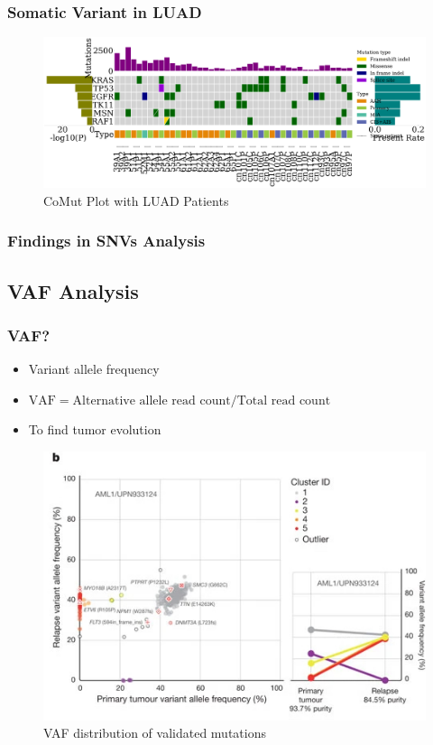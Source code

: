 \documentclass{beamer}
\begin{document}
    \begin{frame}
        \frametitle{Somatic Variant in LUAD}

        \begin{figure}
            \includegraphics[width=\linewidth]{figures/Mutect2/BWA-ADC.pdf}
            \caption{CoMut Plot with LUAD Patients}
        \end{figure}
    \end{frame}

    \begin{frame}
        \frametitle{Findings in SNVs Analysis}
    \end{frame}

    \subsection{VAF Analysis}
    \begin{frame}
        \frametitle{VAF?}

        \begin{itemize}
            \item Variant allele frequency
            \item $\textrm{VAF} = \textrm{Alternative allele read count} / \textrm{Total read count}$
            \item To find tumor evolution
        \end{itemize}

        \begin{figure}
            \includegraphics[width=0.4 \linewidth]{figures/VAF/VAF.jpg}
            \caption{VAF distribution of validated mutations \protect\cite{VAF1}}
        \end{figure}
    \end{frame}
\end{document}
